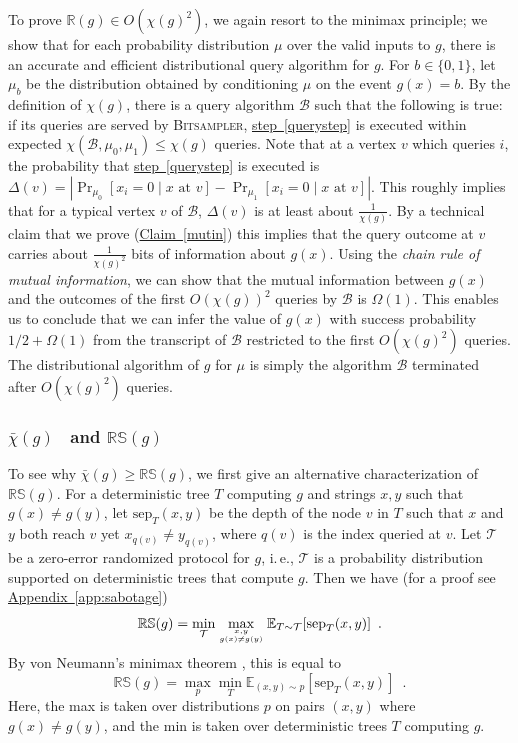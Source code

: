 \documentclass[11pt]{article}
\numberwithin{equation}{section}
\theoremstyle{definition}
\theoremstyle{plain}
\newcommand{\R}{\mathbb R}
\newcommand{\ie}{i.\,e.}
\newcommand{\expref}[2]{\hyperref[#2]{#1~\ref{#2}}}
\newcommand{\clB}{\mathcal{B}}
\newcommand{\clT}{\mathcal{T}}
\newcommand{\RS}{\mathbb{RS}}
\newcommand{\sep}{\mathrm{sep}}
\newcommand{\E}{\mathbb{E}}
\begin{document}
To prove $\R(g) \in O(\chi(g)^2)$, we again resort to the minimax principle; we show that for each probability distribution $\mu$ over the valid inputs to $g$, there is an 
accurate and efficient distributional query algorithm for $g$. For $b \in \{0,1\}$, let $\mu_b$ be the distribution obtained by conditioning $\mu$ on the event $g(x)=b$. By the definition of $\chi(g)$, there is a query algorithm $\clB$ 
such that the following is true: if its queries are served by \textsc{Bitsampler}, \expref{step}{querystep} is executed within expected $\chi(\clB, \mu_0, \mu_1) \leq \chi(g)$ queries. Note that at a vertex $v$ which queries $i$, the probability that 
\expref{step}{querystep} is executed is $\Delta(v) = |\Pr_{\mu_0}[x_{i}=0 \mid x \mbox{ at } v] - \Pr_{\mu_1}[x_{i}=0 \mid x \mbox{ at } v]|$. This roughly implies that for a typical vertex $v$ of $\mathcal{B}$, $\Delta(v)$ is at least about $\frac{1}{\chi(g)}$. By a technical claim that we prove (\expref{Claim}{mutin}) this implies that 
the query outcome at $v$ carries about $\frac{1}{\chi(g)^2}$ bits of information about $g(x)$. Using the \emph{chain rule of mutual information}, we can show that the mutual information between $g(x)$ and the outcomes of the first 
$O(\chi(g))^2$ queries by $\clB$ is $\Omega(1)$. This enables us to conclude that we can infer the value of $g(x)$ with success probability $1/2 + \Omega(1)$ from the transcript of $\clB$ restricted to the first $O(\chi(g)^2)$ queries. 
The distributional algorithm of $g$ for $\mu$ is simply the algorithm $\clB$ terminated after $O(\chi(g)^2)$ queries.

%
\subsubsection{\texorpdfstring{$\bar \chi(g)$ \ and $\RS(g)$}{chi-bar(g) and
    RS(g)}}
To see why $\bar \chi(g) \ge \RS(g)$, we first give an alternative characterization of $\RS(g)$.  For a deterministic tree $T$ computing $g$ and strings $x,y$ such that $g(x) \ne g(y)$, let $\sep_T(x,y)$ be the depth of the node $v$ in $T$ 
such that $x$ and $y$ both reach $v$ yet $x_{q(v)} \ne y_{q(v)}$, where $q(v)$ is the index queried at $v$.  Let $\clT$ be a zero-error randomized protocol for $g$, \ie, $\clT$ is a probability distribution supported on deterministic trees 
that compute $g$.  Then we have (for a proof see \expref{Appendix}{app:sabotage})
\[
\RS(g) = \min_{\clT} \max_{x,y \atop g(x) \ne g(y)} \E_{T \sim \clT} [\sep_T(x,y)] \enspace .
\]
By von Neumann's minimax theorem \cite{vonNeumann}, this is equal to 
\[
\RS(g) = \max_{p} \min_T \E_{(x,y) \sim p} [\sep_T(x,y)] \enspace.
\]
Here, the max is taken over distributions $p$ on pairs $(x,y)$ where $g(x) \ne g(y)$, and the min is taken over deterministic trees $T$ computing $g$.  
\end{document}
